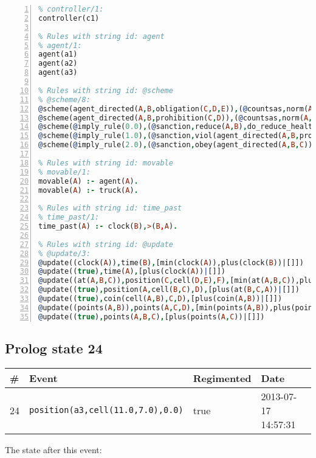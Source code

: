 \documentclass[11pt]{article}\usepackage[utf8]{inputenc}\usepackage{geometry}
\begin{document}
\begin{lstlisting}[language=Prolog, numbers=left]
% Rules with string id: controller
% controller/1:
controller(c1)

% Rules with string id: agent
% agent/1:
agent(a1)
agent(a2)
agent(a3)

% Rules with string id: @scheme
% @scheme/8:
@scheme(agent_directed(A,B,obligation(C,D,E)),(@countsas,norm(A,B,F,obligation(C,D,E)),F),false,(listTrue(C)),(time_past(D)),false,[plus(viol(agent_directed(A,B,obligation(C,D,E))))|[]],[plus(obey(agent_directed(A,B,obligation(C,D,E))))|[]])
@scheme(agent_directed(A,B,prohibition(C,D)),(@countsas,norm(A,B,E,prohibition(C,D)),E),(listTrue(C)),false,(false),false,[plus(viol(agent_directed(A,B,prohibition(C,D))))|[]],[plus(obey(agent_directed(A,B,prohibition(C,D))))|[]])
@scheme(@imply_rule(0.0),(@sanction,reduce(A,B),do_reduce_health(A,B),notifyAgent(A,changed(status))),true,false,false,false,[min(reduce(A,B))|[]],[])
@scheme(@imply_rule(1.0),(@sanction,viol(agent_directed(A,B,prohibition(C,D))),do_sanction(D)),true,false,false,false,[min(viol(agent_directed(A,B,prohibition(C,D))))|[]],[])
@scheme(@imply_rule(2.0),(@sanction,obey(agent_directed(A,B,C))),true,false,false,false,[min(obey(agent_directed(A,B,C)))|[]],[])

% Rules with string id: movable
% movable/1:
movable(A) :- agent(A).
movable(A) :- truck(A).

% Rules with string id: time_past
% time_past/1:
time_past(A) :- clock(B),>(B,A).

% Rules with string id: @update
% @update/3:
@update((clock(A)),time(B),[min(clock(A)),plus(clock(B))|[]])
@update((true),time(A),[plus(clock(A))|[]])
@update((at(A,B,C)),position(C,cell(D,E),F),[min(at(A,B,C)),plus(at(D,E,C))|[]])
@update((true),position(A,cell(B,C),D),[plus(at(B,C,A))|[]])
@update((true),coin(cell(A,B),C,D),[plus(coin(A,B))|[]])
@update((points(A,B)),points(A,C,D),[min(points(A,B)),plus(points(A,D))|[]])
@update((true),points(A,B,C),[plus(points(A,C))|[]])

\end{lstlisting}
\clearpage 
\subsection{Prolog state 24}
\begin{table}[ht]
\centering 
\begin{tabular}{l l l l} 
\textbf{\#} & \textbf{Event} & \textbf{Regimented} & \textbf{Date} \\ [0.5ex] 
\hline
24&\texttt{position(a3,cell(11.0,7.0),0.0)}&true&2013-07-17 14:57:31\\ [1ex] \hline\end{tabular}
\end{table}
The state after this event:
\end{document}
